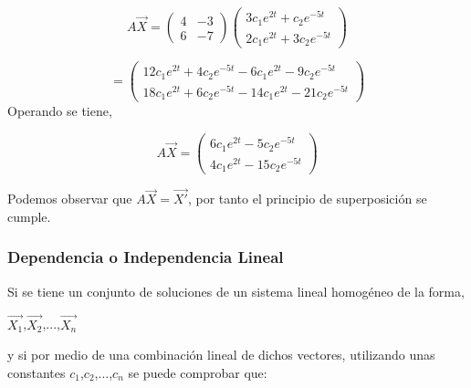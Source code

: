\documentclass[titlepage]{article}
\begin{document}
                \begin{equation*}
                    A\vec{X} = 
                    \begin{pmatrix}
                        4 & -3 \\
                        6 & -7
                    \end{pmatrix}   
                    \begin{pmatrix}
                        3c_1e^{2t}+c_2e^{-5t} \\
                        2c_1e^{2t}+3c_2e^{-5t}
                    \end{pmatrix}
                \end{equation*}    
                 
                \begin{equation*}
                    = 
                    \begin{pmatrix}                                                            12c_1e^{2t}+4c_2e^{-5t}-6c_1e^{2t}-9c_2e^{-5t} \\
                        18c_1e^{2t}+6c_2e^{-5t}-14c_1e^{2t}-21c_2e^{-5t}
                    \end{pmatrix}
                \end{equation*}
                Operando se tiene,
                
                    \begin{equation*}
                    A\vec{X}= 
                    \begin{pmatrix}                                                            6c_1e^{2t}-5c_2e^{-5t} \\
                        4c_1e^{2t}-15c_2e^{-5t}
                    \end{pmatrix}
                \end{equation*}
                
                Podemos observar que $A\vec{X}=\vec{X'}$, por tanto el principio de superposición se cumple.
                
                
        \subsubsection{Dependencia o Independencia Lineal} 
            Si se tiene un conjunto de soluciones de un sistema lineal homogéneo de la forma, \par\vspace{0.1cm}
            \begin{center}
                $\vec{X_1}$,$\vec{X_2}$,...,$\vec{X_n}$
            \end{center} 
            y si por medio de una combinación lineal de dichos vectores, utilizando unas constantes $c_1$,$c_2$,...,$c_n$ se puede comprobar que:
            
\end{document}
